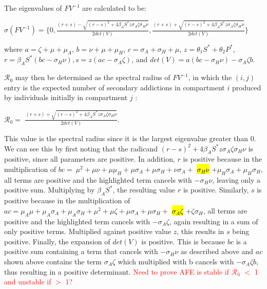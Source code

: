 \documentclass[12pt]{article}
\begin{document}
The eigenvalues of $FV^{-1}$ are calculated to be: 
\begin{center}
$\sigma (FV^{-1}) = \{0, \frac{(r+s)-\sqrt{(r-s)^2+4\beta_{A} S^* z  \sigma_A \zeta \sigma_H \nu}}{2det(V)} 
, \frac{(r+s)+\sqrt{(r-s)^2+4\beta_{A} S^* z  \sigma_A \zeta \sigma_H \nu}}{2det(V)} 
\}$
\end{center}

where $a=\zeta +\mu + \mu_A$, $b=\nu + \mu + \mu_H$, $c= \sigma_A + \sigma_H +\mu$, $z=\theta_1 S^* + \theta_2 P^*$, $ r=\beta_{A} S^* (bc-\sigma_H \nu), s=z(ac-\sigma_{A} \zeta)$, and $det(V)=a(bc-\sigma_H\nu)-\sigma_A\zeta b$.

$\mathscr{R}_0$ may then be determined as the spectral radius of $FV^{-1}$, in which the $(i,j)$ entry is the expected number of secondary addictions in compartment $i$ produced by individuals initially in compartment $j$ :
\begin{center}
$\mathscr{R}_0=$ $\frac{(r+s)+\sqrt{(r-s)^2+4\beta_{A} S^* z  \sigma_A \zeta \sigma_H \nu}}{2det(V)}. $
\end{center}

This value is the spectral radius since it is the largest eigenvalue greater than 0. We can see this by first noting that the radicand $(r-s)^2+4\beta_{A} S^* z  \sigma_{A} \zeta \sigma_{H} \nu$ is positive, since all parameters are positive. In addition, $r$ is positive because in the multiplication of $bc=\ \mu^{2} + \mu \nu+ \mu \mu_{H} + \mu \sigma_{A} + \mu \sigma_{H}+ \nu \sigma_{A}+$ \hl{$ \sigma_{H} \nu $} $+ \mu_{H}\sigma_{A}+\mu_{H}\sigma_{H}$, all terms are positive and the highlighted term cancels with $-\sigma_{H} \nu$, leaving only a positive sum. Multiplying by $\beta_{A} S^*$, the resulting value $r$ is positive. Similarly, $s$ is positive because in the multiplication of $ac= \mu_{A} \mu+ \mu_{A} \sigma_{A}+\mu_{A} \sigma_{H} +\mu^{2} +\mu \zeta+ \mu \sigma_{A}+\mu \sigma_{H}+$ \hl{$\sigma_{A} \zeta$} $+ \zeta \sigma_{H}$, all terms are positive and the highlighted term cancels with $-\sigma_{A} \zeta$, again resulting in a sum of only positive terms. Multiplied against positive value $z$, this results in $s$ being positive. Finally, the expansion of $det(V)$ is positive. This is because $bc$ is a positive sum containing a term that cancels with $-\sigma_{H} \nu$ as described above and $ac$ shown above contains the term $\sigma_{A} \zeta$ which multiplied with b cancels with $-\sigma_A\zeta b,$ thus resulting in a positive determinant. \textcolor{red}{Need to prove AFE is stable if $\mathscr{R}_0$ $<$ 1 and unstable if $>$ 1?}
\end{document}
